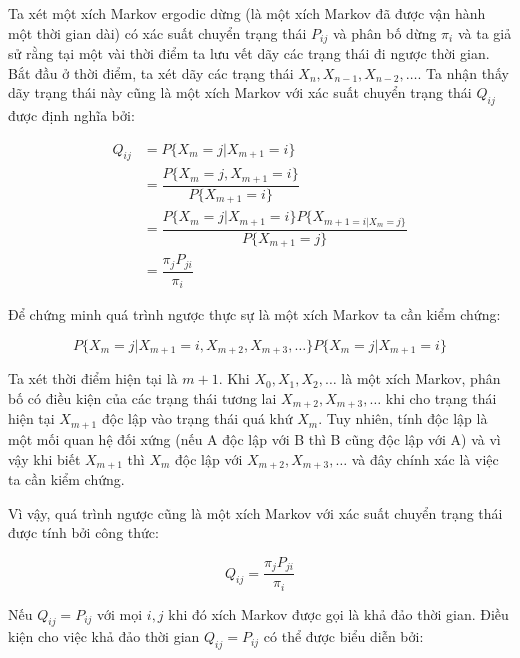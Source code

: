 \documentclass[14pt, a4paper]{article}
\numberwithin{equation}{section}
\numberwithin{figure}{section}
\theoremstyle{sltheorem}
\theoremstyle{soltheorem}
\numberwithin{dl}{section}
\numberwithin{vd}{section}
\begin{document}
    Ta xét một xích Markov ergodic dừng (là một xích Markov đã được vận hành một thời gian dài) có xác suất chuyển trạng thái $P_{ij}$ và phân bố dừng $\pi_i$ và ta giả sử rằng tại một vài thời điểm ta lưu vết dãy các trạng thái đi ngược thời gian.
    Bắt đầu ở thời điểm, ta xét dãy các trạng thái $X_n, X_{n-1}, X_{n-2}, \dots$.
    Ta nhận thấy dãy trạng thái này cũng là một xích Markov với xác suất chuyển trạng thái $Q_{ij}$ được định nghĩa bởi:

    \begin{equation*}
        \begin{aligned}
            Q_{ij} &= P \lbrace X_m = j \vert X_{m+1} = i \rbrace \\
            &= \dfrac{P \lbrace X_m = j, X_{m+1}=i \rbrace}{P \lbrace X_{m+1}=i \rbrace} \\
            &= \dfrac{P \lbrace X_m = j \vert X_{m+1} = i \rbrace P \lbrace X_{m+1=i \vert X_m = j \rbrace}}{P \lbrace X_{m+1}=j \rbrace} \\
            &= \dfrac{\pi_j P_{ji}}{\pi_i}
        \end{aligned}
    \end{equation*}

    Để chứng minh quá trình ngược thực sự là một xích Markov ta cần kiểm chứng:

    \begin{equation*}
        P \lbrace X_m = j \vert X_{m+1}=i, X_{m+2}, X_{m+3}, \dots \rbrace P \lbrace X_m = j \vert X_{m+1}=i \rbrace
    \end{equation*}

    Ta xét thời điểm hiện tại là $m+1$. Khi $X_0, X_1, X_2, \dots$ là một xích Markov, phân bố có điều kiện của các trạng thái tương lai $X_{m+2}, X_{m+3}, \dots$ khi cho trạng thái hiện tại $X_{m+1}$ độc lập vào trạng thái quá khứ $X_m$.
    Tuy nhiên, tính độc lập là một mối quan hệ đối xứng (nếu A độc lập với B thì B cũng độc lập với A) và vì vậy khi biết $X_{m+1}$ thì $X_m$ độc lập với $X_{m+2}, X_{m+3}, \dots$ và đây chính xác là việc ta cần kiểm chứng.

    Vì vậy, quá trình ngược cũng là một xích Markov với xác suất chuyển trạng thái được tính bởi công thức:

    \begin{equation*}
        Q_{ij} = \dfrac{\pi_j P_{ji}}{\pi_i}
    \end{equation*}

    Nếu $Q_{ij} = P_{ij}$ với mọi $i, j$ khi đó xích Markov được gọi là khả đảo thời gian.
    Điều kiện cho việc khả đảo thời gian $Q_{ij}=P_{ij}$ có thể được biểu diễn bởi:
\end{document}
